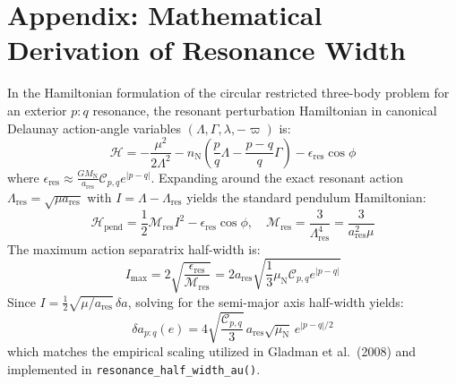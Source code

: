 \documentclass[11pt,a4paper]{article}
\begin{document}
\appendix
\section{Appendix: Mathematical Derivation of Resonance Width}
In the Hamiltonian formulation of the circular restricted three-body problem for an exterior $p:q$ resonance, the resonant perturbation Hamiltonian in canonical Delaunay action-angle variables $(\Lambda, \Gamma, \lambda, -\varpi)$ is:
\begin{equation}
\mathcal{H} = -\frac{\mu^2}{2\Lambda^2} - n_{\text{N}} \left( \frac{p}{q} \Lambda - \frac{p-q}{q} \Gamma \right) - \epsilon_{\text{res}} \cos\phi
\end{equation}
where $\epsilon_{\text{res}} \approx \frac{G M_{\text{N}}}{a_{\text{res}}} \mathcal{C}_{p,q} e^{|p-q|}$. Expanding around the exact resonant action $\Lambda_{\text{res}} = \sqrt{\mu a_{\text{res}}}$ with $I = \Lambda - \Lambda_{\text{res}}$ yields the standard pendulum Hamiltonian:
\begin{equation}
\mathcal{H}_{\text{pend}} = \frac{1}{2} \mathcal{M}_{\text{res}} I^2 - \epsilon_{\text{res}} \cos\phi, \quad \mathcal{M}_{\text{res}} = \frac{3}{\Lambda_{\text{res}}^4} = \frac{3}{a_{\text{res}}^2 \mu}
\end{equation}
The maximum action separatrix half-width is:
\begin{equation}
I_{\max} = 2 \sqrt{\frac{\epsilon_{\text{res}}}{\mathcal{M}_{\text{res}}}} = 2 a_{\text{res}} \sqrt{\frac{1}{3} \mu_{\text{N}} \mathcal{C}_{p,q} e^{|p-q|}}
\end{equation}
Since $I = \frac{1}{2} \sqrt{\mu / a_{\text{res}}} \, \delta a$, solving for the semi-major axis half-width yields:
\begin{equation}
\delta a_{p:q}(e) = 4 \sqrt{\frac{\mathcal{C}_{p,q}}{3}} \, a_{\text{res}} \sqrt{\mu_{\text{N}}} \, e^{|p-q|/2}
\end{equation}
which matches the empirical scaling utilized in Gladman et al.\ (2008) and implemented in \texttt{resonance\_half\_width\_au()}.
\end{document}
